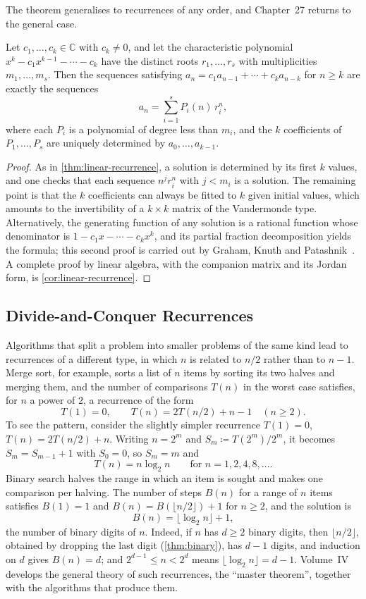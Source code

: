 The theorem generalises to recurrences of any order, and Chapter~27 returns to the general case.

\begin{proposition}
\label{prop:linear-recurrence-k}
Let $c_1,\ldots,c_k\in\mathbb C$ with $c_k\ne0$, and let the characteristic polynomial $x^k-c_1x^{k-1}-\cdots-c_k$ have the distinct roots $r_1,\ldots,r_s$ with multiplicities $m_1,\ldots,m_s$. Then the sequences satisfying $a_n=c_1a_{n-1}+\cdots+c_ka_{n-k}$ for $n\ge k$ are exactly the sequences
\[
a_n=\sum_{i=1}^{s}P_i(n)\,r_i^n,
\]
where each $P_i$ is a polynomial of degree less than $m_i$, and the $k$ coefficients of $P_1,\ldots,P_s$ are uniquely determined by $a_0,\ldots,a_{k-1}$.
\end{proposition}

\begin{proof}
As in \cref{thm:linear-recurrence}, a solution is determined by its first $k$ values, and one checks that each sequence $n^jr_i^n$ with $j<m_i$ is a solution. The remaining point is that the $k$ coefficients can always be fitted to $k$ given initial values, which amounts to the invertibility of a $k\times k$ matrix of the Vandermonde type. Alternatively, the generating function of any solution is a rational function whose denominator is $1-c_1x-\cdots-c_kx^k$, and its partial fraction decomposition yields the formula; this second proof is carried out by Graham, Knuth and Patashnik~\cite[Sect.~7.3]{graham1994concrete}. A complete proof by linear algebra, with the companion matrix and its Jordan form, is \cref{cor:linear-recurrence}.
\end{proof}

\subsection{Divide-and-Conquer Recurrences}

Algorithms that split a problem into smaller problems of the same kind lead to recurrences of a different type, in which $n$ is related to $n/2$ rather than to $n-1$. Merge sort, for example, sorts a list of $n$ items by sorting its two halves and merging them, and the number of comparisons $T(n)$ in the worst case satisfies, for $n$ a power of $2$, a recurrence of the form
\[
T(1)=0,\qquad T(n)=2T(n/2)+n-1\quad(n\ge2).
\]
To see the pattern, consider the slightly simpler recurrence $T(1)=0$, $T(n)=2T(n/2)+n$. Writing $n=2^m$ and $S_m\coloneqq T(2^m)/2^m$, it becomes $S_m=S_{m-1}+1$ with $S_0=0$, so $S_m=m$ and
\[
T(n)=n\log_2n\qquad\text{for }n=1,2,4,8,\ldots .
\]
Binary search halves the range in which an item is sought and makes one comparison per halving. The number of steps $B(n)$ for a range of $n$ items satisfies $B(1)=1$ and $B(n)=B(\lfloor n/2\rfloor)+1$ for $n\ge2$, and the solution is
\[
B(n)=\lfloor\log_2n\rfloor+1,
\]
the number of binary digits of $n$. Indeed, if $n$ has $d\ge2$ binary digits, then $\lfloor n/2\rfloor$, obtained by dropping the last digit (\cref{thm:binary}), has $d-1$ digits, and induction on $d$ gives $B(n)=d$; and $2^{d-1}\le n<2^d$ means $\lfloor\log_2n\rfloor=d-1$. Volume~IV develops the general theory of such recurrences, the ``master theorem'', together with the algorithms that produce them.

